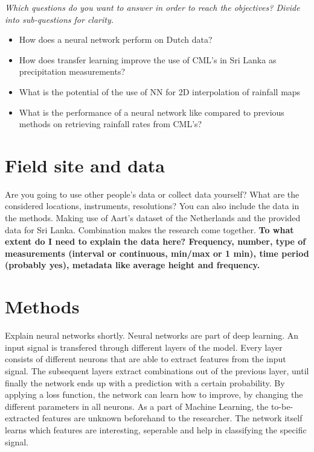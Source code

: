 \documentclass[twocolumn, 10pt, a4paper]{article}
\begin{document}
	\textit{Which questions do you want to answer in order to reach the objectives? Divide into sub-questions for clarity.}
	\begin{itemize}
		\item How does a neural network perform on Dutch data?
		\item How does transfer learning improve the use of CML's in Sri Lanka as precipitation measurements?
		\item What is the potential of the use of NN for 2D interpolation of rainfall maps
		\item What is the performance of a neural network like compared to previous methods on retrieving rainfall rates from CML's?
	\end{itemize}
	
	
	\section{Field site and data}
	
	Are you going to use other people's data or collect data yourself? What are the considered locations, instruments, resolutions? You can also include the data in the methods.
	Making use of Aart's dataset of the Netherlands and the provided data for Sri Lanka. Combination makes the research come together. \textbf{To what extent do I need to explain the data here? Frequency, number, type of measurements (interval or continuous, min/max or 1 min), time period (probably yes), metadata like average height and frequency.}
	
	\section{Methods}
	Explain neural networks shortly.
	Neural networks are part of deep learning. An input signal is transfered through different layers of the model. Every layer consists of different neurons that are able to extract features from the input signal. The subsequent layers extract combinations out of the previous layer, until finally the network ends up with a prediction with a certain probability. By applying a loss function, the network can learn how to improve, by changing the different parameters in all neurons. As a part of Machine Learning, the to-be-extracted features are unknown beforehand to the researcher. The network itself learns which features are interesting, seperable and help in classifying the specific signal. 
	
\end{document}
